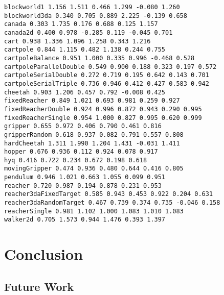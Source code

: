 \documentclass{article} %
\numberwithin{equation}{subsection}
\numberwithin{theorem}{subsection}
\theoremstyle{named}
\begin{document}
\begin{verbatim}
blockworld1 1.156 1.511 0.466 1.299 -0.080 1.260
blockworld3da 0.340 0.705 0.889 2.225 -0.139 0.658
canada 0.303 1.735 0.176 0.688 0.125 1.157
canada2d 0.400 0.978 -0.285 0.119 -0.045 0.701
cart 0.938 1.336 1.096 1.258 0.343 1.216
cartpole 0.844 1.115 0.482 1.138 0.244 0.755
cartpoleBalance 0.951 1.000 0.335 0.996 -0.468 0.528
cartpoleParallelDouble 0.549 0.900 0.188 0.323 0.197 0.572
cartpoleSerialDouble 0.272 0.719 0.195 0.642 0.143 0.701
cartpoleSerialTriple 0.736 0.946 0.412 0.427 0.583 0.942
cheetah 0.903 1.206 0.457 0.792 -0.008 0.425
fixedReacher 0.849 1.021 0.693 0.981 0.259 0.927
fixedReacherDouble 0.924 0.996 0.872 0.943 0.290 0.995
fixedReacherSingle 0.954 1.000 0.827 0.995 0.620 0.999
gripper 0.655 0.972 0.406 0.790 0.461 0.816
gripperRandom 0.618 0.937 0.082 0.791 0.557 0.808
hardCheetah 1.311 1.990 1.204 1.431 -0.031 1.411
hopper 0.676 0.936 0.112 0.924 0.078 0.917
hyq 0.416 0.722 0.234 0.672 0.198 0.618
movingGripper 0.474 0.936 0.480 0.644 0.416 0.805
pendulum 0.946 1.021 0.663 1.055 0.099 0.951
reacher 0.720 0.987 0.194 0.878 0.231 0.953
reacher3daFixedTarget 0.585 0.943 0.453 0.922 0.204 0.631
reacher3daRandomTarget 0.467 0.739 0.374 0.735 -0.046 0.158
reacherSingle 0.981 1.102 1.000 1.083 1.010 1.083
walker2d 0.705 1.573 0.944 1.476 0.393 1.397
\end{verbatim}



\section{Conclusion}
\subsection{Future Work}





%
\end{document}
